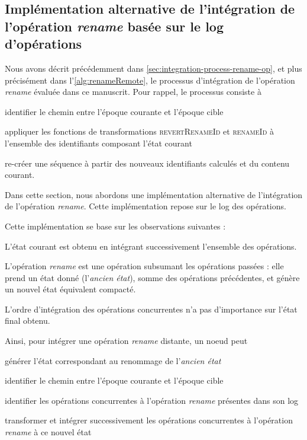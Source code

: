 \documentclass[12pt]{thesul}
\begin{document}
\subsection{Implémentation alternative de l'intégration de l'opération \emph{rename} basée sur le log d'opérations}

Nous avons décrit précédemment dans \autoref{sec:integration-process-rename-op}, et plus précisément dans l'\autoref{alg:renameRemote}, le processus d'intégration de l'opération \emph{rename} évaluée dans ce manuscrit.
Pour rappel, le processus consiste à
\begin{enumerate*}[label=(\roman*)]
  \item identifier le chemin entre l'époque courante et l'époque cible
  \item appliquer les fonctions de transformations \textsc{revertRenameId} et \textsc{renameId} à l'ensemble des identifiants composant l'état courant
  \item re-créer une séquence à partir des nouveaux identifiants calculés et du contenu courant.
\end{enumerate*}

Dans cette section, nous abordons une implémentation alternative de l'intégration de l'opération \emph{rename}.
Cette implémentation repose sur le log des opérations.

Cette implémentation se base sur les observations suivantes :
\begin{enumerate*}[label=(\roman*)]
  \item L'état courant est obtenu en intégrant successivement l'ensemble des opérations.
  \item L'opération \emph{rename} est une opération subsumant les opérations passées : elle prend un état donné (l'\emph{ancien état}), somme des opérations précédentes, et génère un nouvel état équivalent compacté.
  \item L'ordre d'intégration des opérations concurrentes n'a pas d'importance sur l'état final obtenu.
\end{enumerate*}

Ainsi, pour intégrer une opération \emph{rename} distante, un noeud peut
\begin{enumerate*}[label=(\roman*)]
  \item générer l'état correspondant au renommage de l'\emph{ancien état}
  \item identifier le chemin entre l'époque courante et l'époque cible
  \item identifier les opérations concurrentes à l'opération \emph{rename} présentes dans son log
  \item transformer et intégrer successivement les opérations concurrentes à l'opération \emph{rename} à ce nouvel état
\end{enumerate*}
\end{document}
